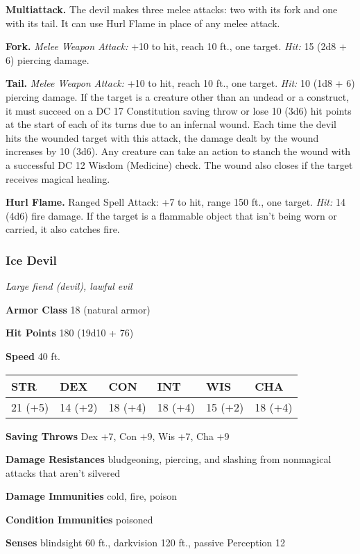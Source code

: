 \documentclass[
]{article}
\begin{document}
\textbf{Multiattack.} The devil makes three melee attacks: two with its
fork and one with its tail. It can use Hurl Flame in place of any melee
attack.

\textbf{Fork.} \emph{Melee Weapon Attack:} +10 to hit, reach 10 ft., one
target. \emph{Hit:} 15 (2d8 + 6) piercing damage.

\textbf{Tail.} \emph{Melee Weapon Attack:} +10 to hit, reach 10 ft., one
target. \emph{Hit:} 10 (1d8 + 6) piercing damage. If the target is a
creature other than an undead or a construct, it must succeed on a DC 17
Constitution saving throw or lose 10 (3d6) hit points at the start of
each of its turns due to an infernal wound. Each time the devil hits the
wounded target with this attack, the damage dealt by the wound increases
by 10 (3d6). Any creature can take an action to stanch the wound with a
successful DC 12 Wisdom (Medicine) check. The wound also closes if the
target receives magical healing.

\textbf{Hurl Flame.} Ranged Spell Attack: +7 to hit, range 150 ft., one
target. \emph{Hit:} 14 (4d6) fire damage. If the target is a flammable
object that isn't being worn or carried, it also catches fire.

\hypertarget{ice-devil}{%
\subsubsection{Ice Devil}\label{ice-devil}}

\emph{Large fiend (devil), lawful evil}

\textbf{Armor Class} 18 (natural armor)

\textbf{Hit Points} 180 (19d10 + 76)

\textbf{Speed} 40 ft.

\begin{longtable}[]{@{}llllll@{}}
\toprule
STR & DEX & CON & INT & WIS & CHA\tabularnewline
\midrule
\endhead
21 (+5) & 14 (+2) & 18 (+4) & 18 (+4) & 15 (+2) & 18 (+4)\tabularnewline
\bottomrule
\end{longtable}

\textbf{Saving Throws} Dex +7, Con +9, Wis +7, Cha +9

\textbf{Damage Resistances} bludgeoning, piercing, and slashing from
nonmagical attacks that aren't silvered

\textbf{Damage Immunities} cold, fire, poison

\textbf{Condition Immunities} poisoned

\textbf{Senses} blindsight 60 ft., darkvision 120 ft., passive
Perception 12
\end{document}
